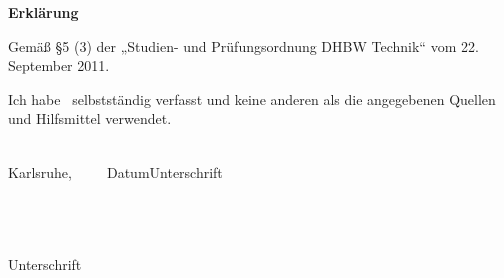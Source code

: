 
\newpage
\thispagestyle{empty}

\begin{center}
\Large\bfseries Erkl\"arung
\end{center}

\noindent
Gem\"a\ss{} \S5 (3)  der „Studien- und Pr\"ufungsordnung DHBW Technik“ vom 22. September 2011.

\medskip
\noindent
Ich habe \WasErklaerung\ selbstst\"andig verfasst und
keine anderen als die angegebenen Quellen und Hilfsmittel verwendet.

\vspace{3cm}
\noindent
\underline{\hspace{4cm}}\hfill\underline{\hspace{6cm}}\\
Karlsruhe,~~~~~Datum\hfill Unterschrift\hspace{4cm}\\ \\ \\

\begin{flushright} 
	\underline{\hspace{6cm}} \\
	Unterschrift
\end{flushright}

